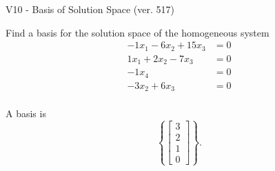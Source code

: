 \begin{exercise}
  \begin{exerciseTitle}V10 - Basis of Solution Space (ver. 517)\end{exerciseTitle}
  \begin{exerciseStatement}
    Find a basis for the solution space of the homogeneous system 
\begin{align*}
 -1 x_ 1 -6 x_ 2 + 15 x_ 3 &= 0  \\ 
  1 x_ 1 + 2 x_ 2 -7 x_ 3 &= 0  \\ 
  -1 x_ 4 &= 0  \\ 
  -3 x_ 2 + 6 x_ 3 &= 0  \\ 
 \end{align*}


 
  \end{exerciseStatement}

  \begin{exerciseAnswer}
   A basis is   
\[\left\{\left[\begin{array}{c}
3 \\
2 \\
1 \\
0
\end{array}\right]\right\}.\]

  


  \end{exerciseAnswer}
\end{exercise}